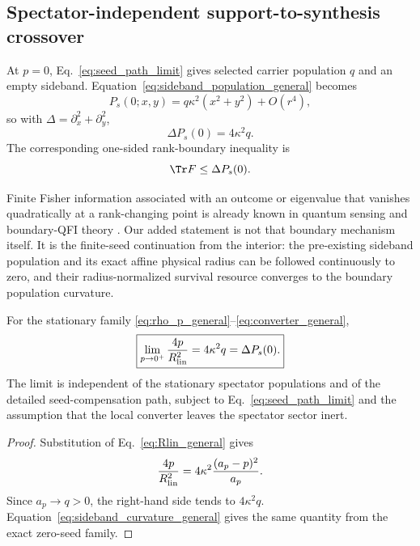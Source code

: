 \subsection{Spectator-independent support-to-synthesis crossover}

At $p=0$, Eq.~\eqref{eq:seed_path_limit} gives selected carrier population $q$ and an empty sideband. Equation~\eqref{eq:sideband_population_general} becomes
\begin{equation}
P_s(0;x,y)=q\kappa^2(x^2+y^2)+O(r^4),
\end{equation}
so with $\Delta=\partial_x^2+\partial_y^2$,
\begin{equation}
\boxed{\Delta P_s(0)=4\kappa^2q.}
\label{eq:sideband_curvature_general}
\end{equation}
The corresponding one-sided rank-boundary inequality is
\begin{equation}
\Tr F\le\Delta P_s(0).
\label{eq:boundary_bound_general}
\end{equation}

Finite Fisher information associated with an outcome or eigenvalue that vanishes quadratically at a rank-changing point is already known in quantum sensing and boundary-QFI theory \cite{GefenRotemRetzker2019,Safranek2017}. Our added statement is not that boundary mechanism itself. It is the finite-seed continuation from the interior: the pre-existing sideband population and its exact affine physical radius can be followed continuously to zero, and their radius-normalized survival resource converges to the boundary population curvature.

\begin{proposition}
For the stationary family \eqref{eq:rho_p_general}--\eqref{eq:converter_general},
\begin{equation}
\boxed{
\lim_{p\to0^+}\frac{4p}{R_{\rm lin}^2}
=4\kappa^2q
=\Delta P_s(0).}
\label{eq:main_crossover_general}
\end{equation}
The limit is independent of the stationary spectator populations and of the detailed seed-compensation path, subject to Eq.~\eqref{eq:seed_path_limit} and the assumption that the local converter leaves the spectator sector inert.
\end{proposition}

\begin{proof}
Substitution of Eq.~\eqref{eq:Rlin_general} gives
\begin{equation}
\frac{4p}{R_{\rm lin}^2}
=4\kappa^2\frac{(a_p-p)^2}{a_p}.
\end{equation}
Since $a_p\to q>0$, the right-hand side tends to $4\kappa^2q$. Equation~\eqref{eq:sideband_curvature_general} gives the same quantity from the exact zero-seed family.
\end{proof}

